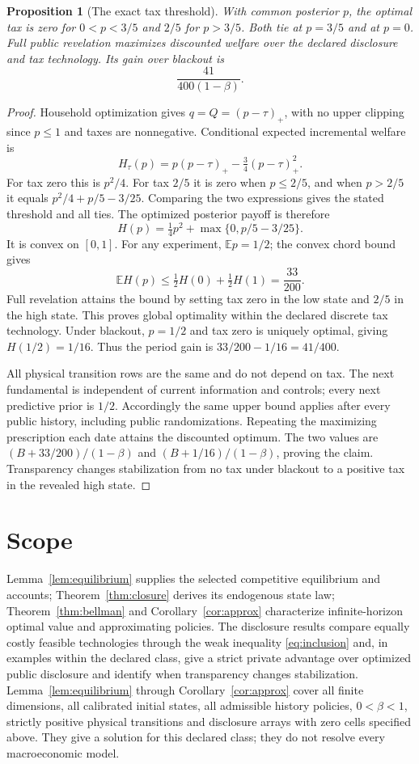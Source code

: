 \documentclass[11pt,a4paper]{article}
\newtheorem{proposition}[theorem]{Proposition}
\newcommand{\E}{\mathbb E}
\begin{document}
\begin{proposition}[The exact tax threshold]\label{prop:tax}
With common posterior $p$, the optimal tax is zero for $0<p<3/5$ and $2/5$
for $p>3/5$. Both tie at $p=3/5$ and at $p=0$. Full public revelation
maximizes discounted welfare over the declared disclosure and tax technology.
Its gain over blackout is
\[
 \frac{41}{400(1-\beta)}.
\]
\end{proposition}
\begin{proof}
Household optimization gives $q=Q=(p-\tau)_+$, with no upper clipping since
$p\leq1$ and taxes are nonnegative. Conditional expected incremental welfare is
\[
 H_\tau(p)=p(p-\tau)_+-\tfrac34(p-\tau)_+^2.
\]
For tax zero this is $p^2/4$. For tax $2/5$ it is zero when $p\leq2/5$,
and when $p>2/5$ it equals
$p^2/4+p/5-3/25$. Comparing the two expressions gives the stated threshold
and all ties. The optimized posterior payoff is therefore
\[
 H(p)=\tfrac14p^2+\max\{0,p/5-3/25\}.
\]
It is convex on $[0,1]$. For any experiment, $\E p=1/2$; the convex chord
bound gives
\[
 \E H(p)\leq\tfrac12H(0)+\tfrac12H(1)=\frac{33}{200}.
\]
Full revelation attains the bound by setting tax zero in the low state and
$2/5$ in the high state. This proves global optimality within the declared
discrete tax technology.
Under blackout, $p=1/2$ and tax zero is uniquely optimal, giving $H(1/2)=1/16$.
Thus the period gain is $33/200-1/16=41/400$.

All physical transition rows are the same and do not depend on tax. The
next fundamental is independent of current information and controls; every
next predictive prior is $1/2$. Accordingly the same upper bound applies
after every public history, including public randomizations. Repeating the
maximizing prescription each date attains the discounted optimum. The two
values are $(B+33/200)/(1-\beta)$ and $(B+1/16)/(1-\beta)$, proving the
claim. Transparency changes stabilization from no tax under blackout to a
positive tax in the revealed high state.
\end{proof}

\section{Scope}
Lemma~\ref{lem:equilibrium} supplies the selected
competitive equilibrium and accounts; Theorem~\ref{thm:closure} derives its
endogenous state law; Theorem~\ref{thm:bellman} and
Corollary~\ref{cor:approx} characterize infinite-horizon optimal value and
approximating policies. The disclosure results compare equally costly feasible
technologies through the weak inequality \eqref{eq:inclusion} and, in examples
within the declared class, give a strict private advantage over optimized public
disclosure and identify when transparency changes stabilization.
Lemma~\ref{lem:equilibrium} through Corollary~\ref{cor:approx} cover all
finite dimensions, all calibrated initial states, all admissible history
policies, $0<\beta<1$, strictly positive physical transitions and disclosure
arrays with zero cells specified above. They give a solution for this declared
class; they do not resolve every macroeconomic model.
\end{document}
